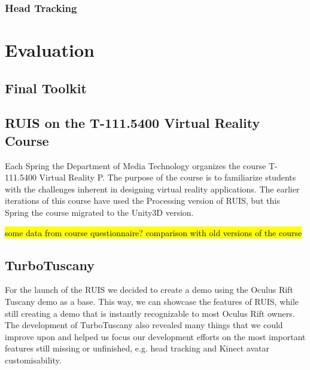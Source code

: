 \documentclass[12pt,a4paper,oneside,pdftex]{report}
\begin{document}
\subsection{Head Tracking}
\label{subsection:wandcontrollers:headtracking}



\chapter{Evaluation}
\label{chapter:evaluation}

\section{Final Toolkit}
\label{section:finaltoolkit}

\section{RUIS on the T-111.5400 Virtual Reality Course}
\label{section:vrcourse}

Each Spring the Department of Media Technology organizes the course T-111.5400 Virtual Reality P. The purpose of the course is to familiarize students with the challenges inherent in designing virtual reality applications. The earlier iterations of this course have used the Processing version of RUIS, but this Spring the course migrated to the Unity3D version. 

\hl{some data from course questionnaire? comparison with old versions of the course}

\section{TurboTuscany}
\label{section:turbotuscany}

For the launch of the RUIS we decided to create a demo using the Oculus Rift Tuscany demo as a base. This way, we can showcase the features of RUIS, while still creating a demo that is instantly recognizable to most Oculus Rift owners. The development of TurboTuscany also revealed many things that we could improve upon and helped us focus our development efforts on the most important features still missing or unfinished, e.g. head tracking and Kinect avatar customisability.
\end{document}
